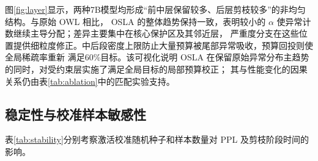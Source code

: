 \documentclass[UTF8,fontset=fandol]{ctexart}
\begin{document}
图\ref{fig:layer}显示，两种7B模型均形成“前中层保留较多、后层剪枝较多”的非均匀结构。与原始 OWL 相比，
OSLA 的整体趋势保持一致，表明较小的 $\alpha$ 使异常计数继续主导分配；差异主要集中在核心保护区及其邻近层，
严重度分支在这些位置提供细粒度修正。中后段密度上限防止大量预算被尾部异常吸收，预算回投则使全局稀疏率重新
满足60\%目标。该可视化说明 OSLA 在保留原始异常分布主趋势的同时，对受约束层实施了满足全局目标的局部预算校正；
其与性能变化的因果关系仍由表\ref{tab:ablation}中的匹配实验支持。

\FloatBarrier
\subsection{稳定性与校准样本敏感性}

表\ref{tab:stability}分别考察激活校准随机种子和样本数量对 PPL 及剪枝阶段时间的影响。
\end{document}
